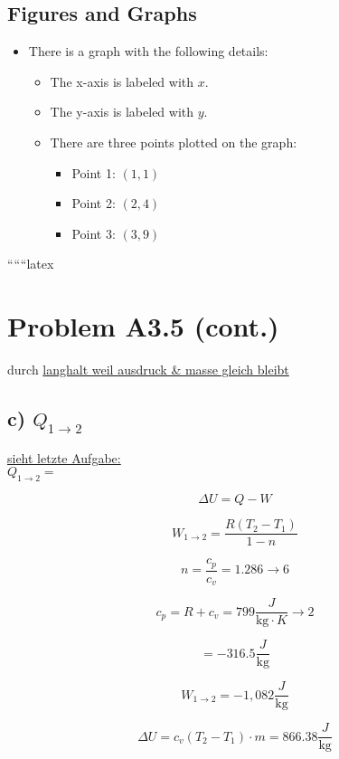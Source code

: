 \subsection*{Figures and Graphs}
\begin{itemize}
    \item There is a graph with the following details:
    \begin{itemize}
        \item The x-axis is labeled with $x$.
        \item The y-axis is labeled with $y$.
        \item There are three points plotted on the graph:
        \begin{itemize}
            \item Point 1: $(1, 1)$
            \item Point 2: $(2, 4)$
            \item Point 3: $(3, 9)$
        \end{itemize}
    \end{itemize}
\end{itemize}

``````latex


\section*{Problem A3.5 (cont.)}

\noindent
durch \underline{langhalt weil ausdruck \& masse gleich bleibt}

\subsection*{c) $Q_{1 \rightarrow 2}$}

\noindent
\underline{sieht letzte Aufgabe:} \\
$Q_{1 \rightarrow 2} = $

\[
\Delta U = Q - W
\]

\[
W_{1 \rightarrow 2} = \frac{R(T_2 - T_1)}{1 - n}
\]

\[
n = \frac{c_p}{c_v} = 1.286 \rightarrow 6
\]

\[
c_p = R + c_v = 799 \frac{J}{\text{kg} \cdot K} \rightarrow 2
\]

\[
= -316.5 \frac{J}{\text{kg}}
\]

\[
W_{1 \rightarrow 2} = -1,082 \frac{J}{\text{kg}}
\]

\[
\Delta U = c_v (T_2 - T_1) \cdot m = 866.38 \frac{J}{\text{kg}}
\]

